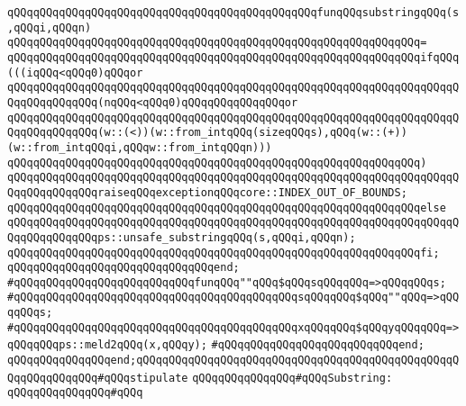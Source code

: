 \verb|qQQqqQQqqQQqqQQqqQQqqQQqqQQqqQQqqQQqqQQqqQQqqQQqfunqQQqsubstringqQQq(s,qQQqi,qQQqn)|\newline
\verb|qQQqqQQqqQQqqQQqqQQqqQQqqQQqqQQqqQQqqQQqqQQqqQQqqQQqqQQqqQQqqQQq=|\newline
\verb|qQQqqQQqqQQqqQQqqQQqqQQqqQQqqQQqqQQqqQQqqQQqqQQqqQQqqQQqqQQqqQQqifqQQq(((iqQQq<qQQq0)qQQqor|\newline
\verb|qQQqqQQqqQQqqQQqqQQqqQQqqQQqqQQqqQQqqQQqqQQqqQQqqQQqqQQqqQQqqQQqqQQqqQQqqQQqqQQqqQQq(nqQQq<qQQq0)qQQqqQQqqQQqqQQqor|\newline
\verb|qQQqqQQqqQQqqQQqqQQqqQQqqQQqqQQqqQQqqQQqqQQqqQQqqQQqqQQqqQQqqQQqqQQqqQQqqQQqqQQqqQQq(w::(<))(w::from_intqQQq(sizeqQQqs),qQQq(w::(+))(w::from_intqQQqi,qQQqw::from_intqQQqn)))|\newline
\verb|qQQqqQQqqQQqqQQqqQQqqQQqqQQqqQQqqQQqqQQqqQQqqQQqqQQqqQQqqQQqqQQq)|\newline
\verb|qQQqqQQqqQQqqQQqqQQqqQQqqQQqqQQqqQQqqQQqqQQqqQQqqQQqqQQqqQQqqQQqqQQqqQQqqQQqqQQqqQQqraiseqQQqexceptionqQQqcore::INDEX_OUT_OF_BOUNDS;|\newline
\verb|qQQqqQQqqQQqqQQqqQQqqQQqqQQqqQQqqQQqqQQqqQQqqQQqqQQqqQQqqQQqqQQqelse|\newline
\verb|qQQqqQQqqQQqqQQqqQQqqQQqqQQqqQQqqQQqqQQqqQQqqQQqqQQqqQQqqQQqqQQqqQQqqQQqqQQqqQQqqQQqps::unsafe_substringqQQq(s,qQQqi,qQQqn);|\newline
\verb|qQQqqQQqqQQqqQQqqQQqqQQqqQQqqQQqqQQqqQQqqQQqqQQqqQQqqQQqqQQqqQQqfi;|\newline
\verb|qQQqqQQqqQQqqQQqqQQqqQQqqQQqqQQqend;|\newline
\newline
\verb|#qQQqqQQqqQQqqQQqqQQqqQQqqQQqfunqQQq""qQQq$qQQqsqQQqqQQq=>qQQqqQQqs;|\newline
\verb|#qQQqqQQqqQQqqQQqqQQqqQQqqQQqqQQqqQQqqQQqqQQqsqQQqqQQq$qQQq""qQQq=>qQQqqQQqs;|\newline
\verb|#qQQqqQQqqQQqqQQqqQQqqQQqqQQqqQQqqQQqqQQqqQQqxqQQqqQQq$qQQqyqQQqqQQq=>qQQqqQQqps::meld2qQQq(x,qQQqy);|\newline
\verb|#qQQqqQQqqQQqqQQqqQQqqQQqqQQqend;|\newline
\newline
\verb|qQQqqQQqqQQqqQQqend;qQQqqQQqqQQqqQQqqQQqqQQqqQQqqQQqqQQqqQQqqQQqqQQqqQQqqQQqqQQqqQQq#qQQqstipulate|\newline
\newline
\verb|qQQqqQQqqQQqqQQq#qQQqSubstring:|\newline
\verb|qQQqqQQqqQQqqQQq#qQQq|\newline
